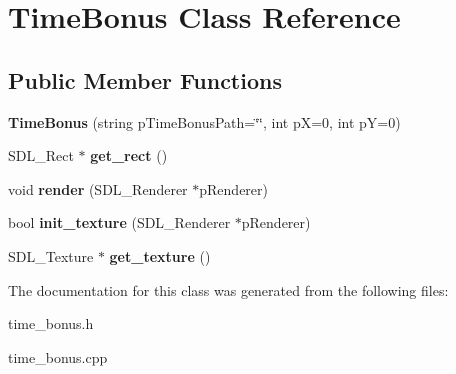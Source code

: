 \hypertarget{classTimeBonus}{}\section{Time\+Bonus Class Reference}
\label{classTimeBonus}
\subsection*{Public Member Functions}
\begin{DoxyCompactItemize}
\item 
\mbox{\label{classTimeBonus_ae3b083d872b479fc9d759a9f1a5b7420}} 
{\bfseries Time\+Bonus} (string p\+Time\+Bonus\+Path=\char`\"{}\char`\"{}, int pX=0, int pY=0)
\item 
\mbox{\label{classTimeBonus_ada769c74f94d6597f71c96fa8aa3af46}} 
S\+D\+L\+\_\+\+Rect $\ast$ {\bfseries get\+\_\+rect} ()
\item 
\mbox{\label{classTimeBonus_adca388fc06c39cc3d6f67f47bd64f597}} 
void {\bfseries render} (S\+D\+L\+\_\+\+Renderer $\ast$p\+Renderer)
\item 
\mbox{\label{classTimeBonus_ad035b3ee3efa7f94295745dc9a2571ad}} 
bool {\bfseries init\+\_\+texture} (S\+D\+L\+\_\+\+Renderer $\ast$p\+Renderer)
\item 
\mbox{\label{classTimeBonus_a30deaaf1c52cd3c4d9a97fb72a25f0b4}} 
S\+D\+L\+\_\+\+Texture $\ast$ {\bfseries get\+\_\+texture} ()
\end{DoxyCompactItemize}


The documentation for this class was generated from the following files\+:\begin{DoxyCompactItemize}
\item 
time\+\_\+bonus.\+h\item 
time\+\_\+bonus.\+cpp\end{DoxyCompactItemize}
